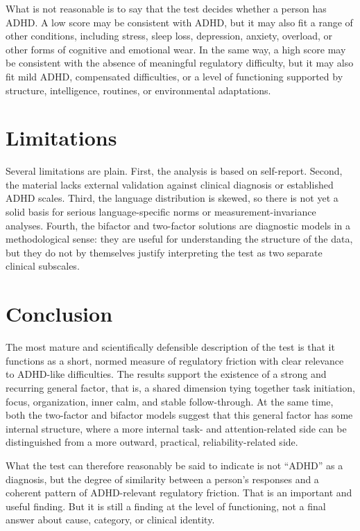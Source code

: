 \documentclass[11pt,a4paper]{article}
\begin{document}
What is not reasonable is to say that the test decides whether a person has ADHD. A low score may be consistent with ADHD, but it may also fit a range of other conditions, including stress, sleep loss, depression, anxiety, overload, or other forms of cognitive and emotional wear. In the same way, a high score may be consistent with the absence of meaningful regulatory difficulty, but it may also fit mild ADHD, compensated difficulties, or a level of functioning supported by structure, intelligence, routines, or environmental adaptations.

\section{Limitations}
Several limitations are plain. First, the analysis is based on self-report. Second, the material lacks external validation against clinical diagnosis or established ADHD scales. Third, the language distribution is skewed, so there is not yet a solid basis for serious language-specific norms or measurement-invariance analyses. Fourth, the bifactor and two-factor solutions are diagnostic models in a methodological sense: they are useful for understanding the structure of the data, but they do not by themselves justify interpreting the test as two separate clinical subscales.

\section{Conclusion}
The most mature and scientifically defensible description of the test is that it functions as a short, normed measure of regulatory friction with clear relevance to ADHD-like difficulties. The results support the existence of a strong and recurring general factor, that is, a shared dimension tying together task initiation, focus, organization, inner calm, and stable follow-through. At the same time, both the two-factor and bifactor models suggest that this general factor has some internal structure, where a more internal task- and attention-related side can be distinguished from a more outward, practical, reliability-related side.

What the test can therefore reasonably be said to indicate is not ``ADHD'' as a diagnosis, but the degree of similarity between a person's responses and a coherent pattern of ADHD-relevant regulatory friction. That is an important and useful finding. But it is still a finding at the level of functioning, not a final answer about cause, category, or clinical identity.

\printbibliography
\end{document}
